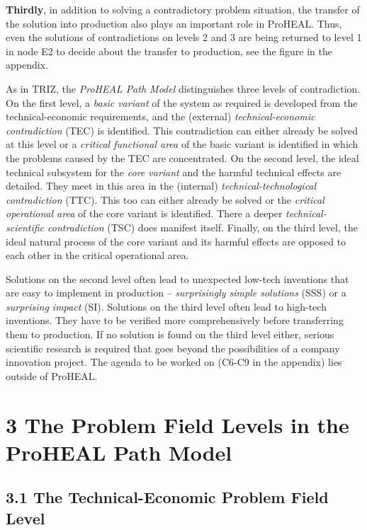 \documentclass[12pt,a4paper]{article}
\begin{document}
\textbf{Thirdly}, in addition to solving a contradictory problem situation,
the transfer of the solution into production also plays an important role in
ProHEAL. Thus, even the solutions of contradictions on levels 2 and 3 are
being returned to level 1 in node E2 to decide about the transfer to
production, see the figure in the appendix.

As in TRIZ, the \emph{ProHEAL Path Model} distinguishes three levels of
contradiction. On the first level, a \emph{basic variant} of the system as
required is developed from the technical-economic requirements, and the
(external) \emph{technical-economic contradiction} (TEC) is identified. This
contradiction can either already be solved at this level or a \emph{critical
  functional area} of the basic variant is identified in which the problems
caused by the TEC are concentrated. On the second level, the ideal technical
subsystem for the \emph{core variant} and the harmful technical effects are
detailed. They meet in this area in the (internal)
\emph{technical-technological contradiction} (TTC). This too can either
already be solved or the \emph{critical operational area} of the core variant
is identified. There a deeper \emph{technical-scientific contradiction} (TSC)
does manifest itself. Finally, on the third level, the ideal natural process
of the core variant and its harmful effects are opposed to each other in the
critical operational area.

Solutions on the second level often lead to unexpected low-tech inventions
that are easy to implement in production – \emph{surprisingly simple
  solutions} (SSS) or a \emph{surprising impact} (SI). Solutions on the third
level often lead to high-tech inventions. They have to be verified more
comprehensively before transferring them to production. If no solution is
found on the third level either, serious scientific research is required that
goes beyond the possibilities of a company innovation project. The agenda to
be worked on (C6-C9 in the appendix) lies outside of ProHEAL.

\section*{3 The Problem Field Levels in the\\ ProHEAL Path Model}

\subsection*{3.1 The Technical-Economic Problem Field Level}
\end{document}
